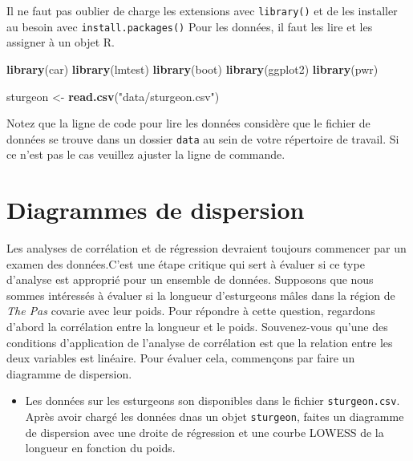 \documentclass[12pt,]{book}
\makeatletter
\newenvironment{Shaded}{\begin{snugshade}}{\end{snugshade}}
\newcommand{\KeywordTok}[1]{\textcolor[rgb]{0.13,0.29,0.53}{\textbf{#1}}}
\newcommand{\NormalTok}[1]{#1}
\newcommand{\StringTok}[1]{\textcolor[rgb]{0.31,0.60,0.02}{#1}}
\providecommand{\tightlist}{%
  \setlength{\itemsep}{0pt}\setlength{\parskip}{0pt}}
\newenvironment{kframe}{%
\medskip{}
\setlength{\fboxsep}{.8em}
\def\at@end@of@kframe{}%
\ifinner\ifhmode%
 \def\at@end@of@kframe{\end{minipage}}%
 \begin{minipage}{\columnwidth}%
\fi\fi%
\def\FrameCommand##1{\hskip\@totalleftmargin \hskip-\fboxsep
\colorbox{incolor}{##1}\hskip-\fboxsep
    \hskip-\linewidth \hskip-\@totalleftmargin \hskip\columnwidth}%
\MakeFramed {\advance\hsize-\width
  \@totalleftmargin\z@ \linewidth\hsize
  \@setminipage}}%
{\par\unskip\endMakeFramed%
\at@end@of@kframe}
\newenvironment{rmdblock}[1]
 {
 \begin{itemize}
 \renewcommand{\labelitemi}{
   \raisebox{-.7\height}[0pt][0pt]{
     {\setkeys{Gin}{width=3em,keepaspectratio}\texttt{[image: images/\#1]}}
   }
 }
 \begin{kframe}
 \setlength{\fboxsep}{1em}
 \item
 }
 {
 \end{kframe}
 \end{itemize}
 }
\newenvironment{rmdnote}
  {\begin{rmdblock}{note}}
  {\end{rmdblock}}
\makeatother
\begin{document}
Il ne faut pas oublier de charge les extensions avec \texttt{library()} et de les installer au besoin avec \texttt{install.packages()}
Pour les données, il faut les lire et les assigner à un objet R.

\begin{Shaded}
\begin{Highlighting}[]
\KeywordTok{library}\NormalTok{(car)}
\KeywordTok{library}\NormalTok{(lmtest)}
\KeywordTok{library}\NormalTok{(boot)}
\KeywordTok{library}\NormalTok{(ggplot2)}
\KeywordTok{library}\NormalTok{(pwr)}

\NormalTok{sturgeon <-}\StringTok{ }\KeywordTok{read.csv}\NormalTok{(}\StringTok{"data/sturgeon.csv"}\NormalTok{)}
\end{Highlighting}
\end{Shaded}

\begin{rmdnote}
Notez que la ligne de code pour lire les données considère que le fichier de données se trouve dans un dossier \texttt{data} au sein de votre répertoire de travail. Si ce n'est pas le cas veuillez ajuster la ligne de commande.
\end{rmdnote}

\hypertarget{diagrammes-de-dispersion}{%
\section{Diagrammes de dispersion}\label{diagrammes-de-dispersion}}

Les analyses de corrélation et de régression devraient toujours commencer par un examen des données.C'est une étape critique qui sert à évaluer si ce type d'analyse est approprié pour un ensemble de données.
Supposons que nous sommes intéressés à évaluer si la longueur d'esturgeons mâles dans la région de \emph{The Pas} covarie avec leur poids.
Pour répondre à cette question, regardons d'abord la corrélation entre
la longueur et le poids.
Souvenez-vous qu'une des conditions d'application de l'analyse de
corrélation est que la relation entre les deux variables est linéaire. Pour
évaluer cela, commençons par faire un diagramme de dispersion.

\begin{itemize}
\tightlist
\item
  Les données sur les esturgeons son disponibles dans le fichier \texttt{sturgeon.csv}.
  Après avoir chargé les données dnas un objet \texttt{sturgeon}, faites un diagramme de dispersion avec une droite de régression et une courbe LOWESS de la longueur en fonction du poids.
\end{itemize}
\end{document}
